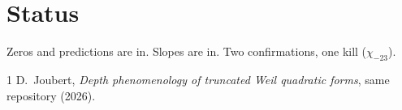 \documentclass[10pt]{article}
\begin{document}
\section{Status}

Zeros and predictions are in. Slopes are in. Two confirmations, one kill ($\chi_{-23}$).

\begin{thebibliography}{1}\small
{} D.~Joubert, \emph{Depth phenomenology of truncated Weil
quadratic forms}, same repository (2026).
\end{thebibliography}
\end{document}
